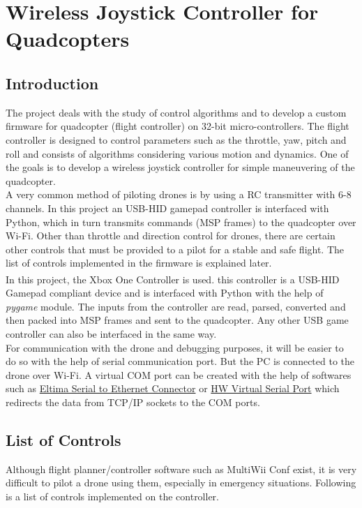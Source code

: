 \documentclass[a4paper,12pt,oneside]{book}
\begin{document}
\chapter[Wireless Joystick Controller for Quadcopters]{Wireless Joystick Controller for Quadcopters}
\section{Introduction}
The project deals with the study of control algorithms and to develop a custom firmware for quadcopter (flight controller) on 32-bit micro-controllers. The flight controller is designed to control parameters such as the throttle, yaw, pitch and roll and consists of algorithms considering various motion and dynamics. One of the goals is to develop a wireless joystick controller for simple maneuvering of the quadcopter.\\ 

A very common method of piloting drones is by using a RC transmitter with 6-8 channels. In this project an USB-HID gamepad controller is interfaced with Python, which in turn transmits commands (MSP frames) to the quadcopter over Wi-Fi. Other than throttle and direction control for drones, there are certain other controls that must be provided to a pilot for a stable and safe flight. The list of controls implemented in the firmware is explained later.\\

In this project, the Xbox\textsuperscript{\textregistered} One Controller\cite{xbox} is used. this controller is a USB-HID Gamepad compliant device and is interfaced with Python with the help of \textit{pygame} module. The inputs from the controller are read, parsed, converted and then packed into MSP frames and sent to the quadcopter. Any other USB game controller can also be interfaced in the same way.\\

For communication with the drone and debugging purposes, it will be easier to do so with the help of serial communication port. But the PC is connected to the drone over Wi-Fi. A virtual COM port can be created with the help of softwares such as \href{https://www.eltima.com/products/serial-over-ethernet/}{Eltima Serial to Ethernet Connector} or \href{http://www.hw-group.com/products/hw_vsp/index_en.html}{HW Virtual Serial Port} which redirects the data from TCP/IP sockets to the COM ports.\\

\section{List of Controls}
\label{sec:loc}
Although flight planner/controller software such as MultiWii Conf exist, it is very difficult to pilot a drone using them, especially in emergency situations. Following is a list of controls implemented on the controller.\\
\end{document}
